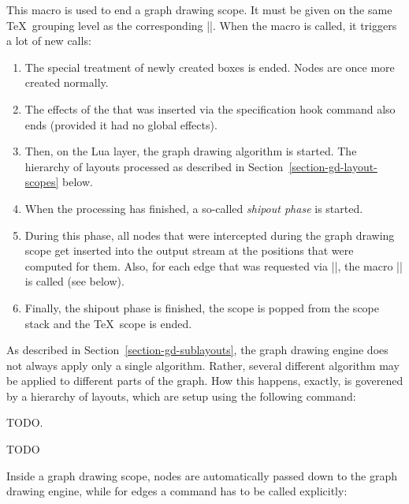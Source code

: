 \begin{command}{\pgfgdendscope}
  This macro is used to end a graph drawing scope. It must be given on
  the same \TeX\ grouping level as the corresponding
  |\pgfgdbeginscope|. When the macro is called, it triggers a lot of
  new calls:
  \begin{enumerate}
  \item The special treatment of newly created boxes is ended. Nodes
    are once more created normally.
  \item The effects of the  that was inserted via the
    specification hook command also ends (provided it had no global
    effects).
  \item Then, on the Lua layer, the graph drawing algorithm is
    started. The hierarchy of layouts processed as described in
    Section~\ref{section-gd-layout-scopes} below.
  \item When the processing has finished, a so-called \emph{shipout
      phase} is started.
  \item During this phase, all nodes that were intercepted during the
    graph drawing scope get inserted into the output stream at the
    positions that were computed for them. Also, for each edge that
    was requested via |\pgfgdedge|, the macro |\pgfgdedgecallback| is
    called (see below).
  \item Finally, the shipout phase is finished, the scope is popped
    from the scope stack and the \TeX\ scope is ended. 
  \end{enumerate}
\end{command}




\label{section-gd-layout-scopes}

As described in Section~\ref{section-gd-sublayouts}, the graph drawing
engine does not always apply only a single algorithm. Rather, several
different algorithm may be applied to different parts of the
graph. How this happens, exactly, is goverened by a hierarchy of
layouts, which are setup using the following command:

TODO.



TODO


Inside a graph drawing scope, nodes are
automatically passed down to the graph drawing engine, while for edges
a command has to be called explicitly:

